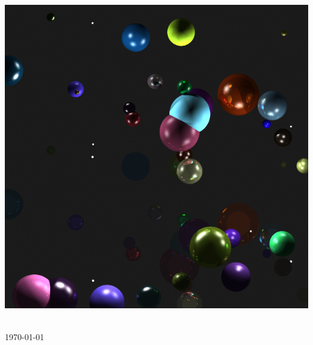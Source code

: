 \begin{titlepage}
\begin{center}
		\begin{center}
			\includegraphics[scale=0.45]{cover.png} 
		\end{center}
	
    
        \HRule\\[0.5cm]
        { \large \today }
    \end{center}
\end{titlepage}

